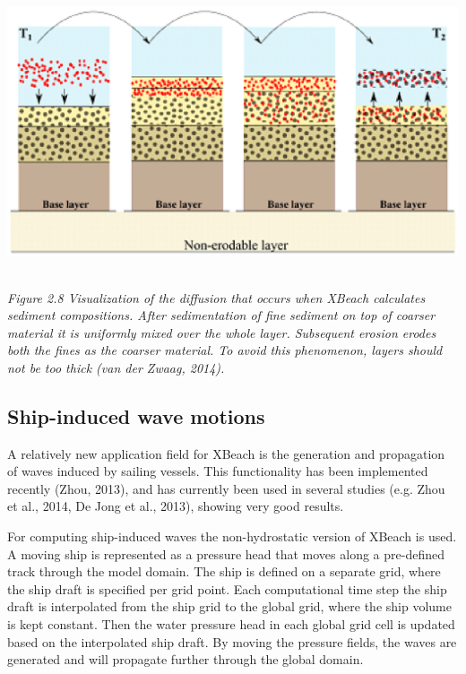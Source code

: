 \documentclass{article}
\begin{document}
\noindent \includegraphics*[width=6.05in, height=3.27in, keepaspectratio=false]{image19}

\noindent \textit{Figure 2.8 Visualization of the diffusion that occurs when XBeach calculates sediment compositions. After sedimentation of fine sediment on top of coarser material it is uniformly mixed over the whole layer. Subsequent erosion erodes both the fines as the coarser material. To avoid this phenomenon, layers should not be too thick (van der Zwaag, 2014).}


\subsection{ Ship-induced wave motions}

\noindent A relatively new application field for XBeach is the generation and propagation of waves induced by sailing vessels. This functionality has been implemented recently (Zhou, 2013), and has currently been used in several studies (e.g. Zhou et al., 2014, De Jong et al., 2013), showing very good results.

\noindent 

\noindent For computing ship-induced waves the non-hydrostatic version of XBeach is used. A moving ship is represented as a pressure head that moves along a pre-defined track through the model domain. The ship is defined on a separate grid, where the ship draft is specified per grid point. Each computational time step the ship draft is interpolated from the ship grid to the global grid, where the ship volume is kept constant. Then the water pressure head in each global grid cell is updated based on the interpolated ship draft. By moving the pressure fields, the waves are generated and will propagate further through the global domain.
\end{document}
